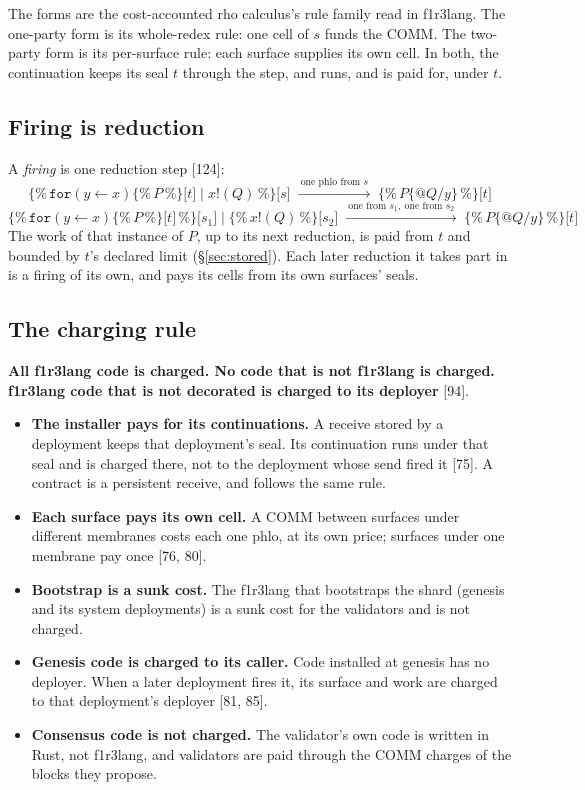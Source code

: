 \documentclass[10.5pt]{article}
\newcommand{\ob}{\texttt{\{\%}}
\newcommand{\cb}{\texttt{\%\}}}
\newcommand{\sealed}[2]{\ensuremath{\ob\,#1\,\cb\texttt{[}#2\texttt{]}}}
\newcommand{\D}[1]{{\color{muted}\small[#1]}}
\begin{document}
The forms are the cost-accounted rho calculus's rule family read in f1r3lang. The one-party form is its whole-redex rule: one cell of $s$ funds the COMM. The two-party form is its per-surface rule: each surface supplies its own cell. In both, the continuation keeps its seal $t$ through the step, and runs, and is paid for, under $t$.

\subsection{Firing is reduction}\label{sec:firing}

A \emph{firing} is one reduction step \D{124}:
\[
\sealed{\mathtt{for}(y \leftarrow x)\sealed{P}{t} \mid x!(Q)}{s}
\;\xrightarrow{\ \text{one phlo from } s\ }\;
\sealed{P\{@Q/y\}}{t}
\]
\[
\sealed{\mathtt{for}(y \leftarrow x)\sealed{P}{t}}{s_1} \mid \sealed{x!(Q)}{s_2}
\;\xrightarrow{\ \text{one from } s_1,\ \text{one from } s_2\ }\;
\sealed{P\{@Q/y\}}{t}
\]
The work of that instance of $P$, up to its next reduction, is paid from $t$ and bounded by $t$'s declared limit (\S\ref{sec:stored}). Each later reduction it takes part in is a firing of its own, and pays its cells from its own surfaces' seals.

\subsection{The charging rule}\label{sec:charging}

\begin{keypoint}
\textbf{All f1r3lang code is charged. No code that is not f1r3lang is charged. f1r3lang code that is not decorated is charged to its deployer} \D{94}.
\end{keypoint}
\begin{itemize}
\item \textbf{The installer pays for its continuations.} A receive stored by a deployment keeps that deployment's seal. Its continuation runs under that seal and is charged there, not to the deployment whose send fired it \D{75}. A contract is a persistent receive, and follows the same rule.
\item \textbf{Each surface pays its own cell.} A COMM between surfaces under different membranes costs each one phlo, at its own price; surfaces under one membrane pay once \D{76, 80}.
\item \textbf{Bootstrap is a sunk cost.} The f1r3lang that bootstraps the shard (genesis and its system deployments) is a sunk cost for the validators and is not charged.
\item \textbf{Genesis code is charged to its caller.} Code installed at genesis has no deployer. When a later deployment fires it, its surface and work are charged to that deployment's deployer \D{81, 85}.
\item \textbf{Consensus code is not charged.} The validator's own code is written in Rust, not f1r3lang, and validators are paid through the COMM charges of the blocks they propose.
\end{itemize}
\end{document}
